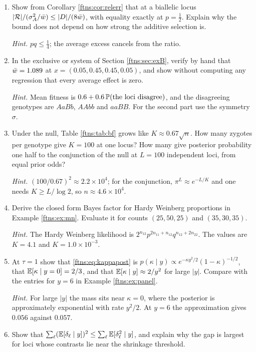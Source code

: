 \begin{enumerate}[label=\arabic*.,leftmargin=*]
\item Show from Corollary \ref{ftns:cor:relerr} that at a biallelic locus
$|\mathcal{R}|/(\sigma^{2}_{A}/\bar{w})\le|D|/(8\bar{w})$, with equality exactly at $p=\tfrac12$. Explain why the bound does
not depend on how strong the additive selection is.

\emph{Hint.} $pq\le\tfrac14$; the average excess cancels from the ratio.

\item In the exclusive or system of Section \ref{ftns:sec:exB}, verify by hand that
$\bar{w}=1.089$ at $x=(0.05,0.45,0.45,0.05)$, and show without computing any regression that every
average effect is zero.

\emph{Hint.} Mean fitness is $0.6+0.6\,\mathbb{P}(\text{the loci disagree})$, and the disagreeing
genotypes are $AaBb$, $AAbb$ and $aaBB$. For the second part use the symmetry $\sigma$.

\item Under the null, Table \ref{ftns:tab:bf} grows like $K\approx0.67\sqrt n$. How many zygotes
per genotype give $K=100$ at one locus? How many give posterior probability one half to the
conjunction of the null at $L=100$ independent loci, from equal prior odds?

\emph{Hint.} $(100/0.67)^2\approx2.2\times10^4$; for the conjunction, $\pi^L\approx e^{-L/K}$ and one
needs $K\ge L/\log2$, so $n\approx4.6\times10^4$.

\item Derive the closed form Bayes factor for Hardy Weinberg proportions in Example \ref{ftns:ex:mn}.
Evaluate it for counts $(25,50,25)$ and $(35,30,35)$.

\emph{Hint.} The Hardy Weinberg likelihood is $2^{n_{12}}p^{2n_{11}+n_{12}}q^{n_{12}+2n_{22}}$.
The values are $K=4.1$ and $K=1.0\times10^{-3}$.

\item At $\tau=1$ show that \eqref{ftns:eq:kappapost} is
$p(\kappa\mid y)\propto e^{-\kappa y^2/2}(1-\kappa)^{-1/2}$, that $\mathbb{E}[\kappa\mid y=0]=2/3$, and that
$\mathbb{E}[\kappa\mid y]\approx2/y^2$ for large $|y|$. Compare with the entries for $y=6$ in
Example \ref{ftns:ex:panel}.

\emph{Hint.} For large $|y|$ the mass sits near $\kappa=0$, where the posterior is approximately
exponential with rate $y^2/2$. At $y=6$ the approximation gives $0.056$ against $0.057$.

\item Show that $\sum_\ell(\mathbb{E}[\delta_\ell\mid y])^2\le\sum_\ell\mathbb{E}[\delta^2_\ell\mid y]$, and explain
why the gap is largest for loci whose contrasts lie near the shrinkage threshold.


\end{enumerate}
